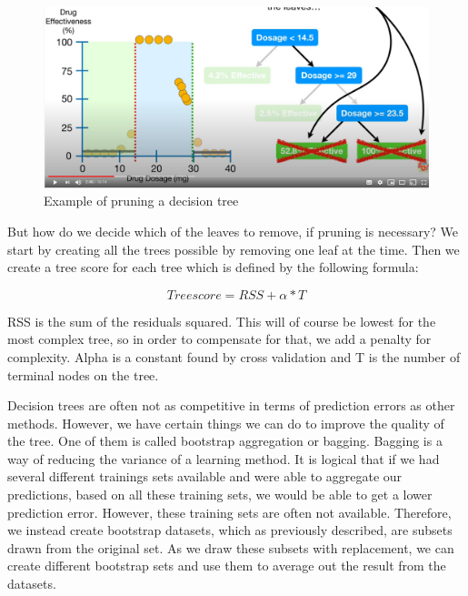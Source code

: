 \begin{figure}[H]
	\centering
	\includegraphics[width=\textwidth]{Img/tree_pruning.PNG}
	\caption{Example of pruning a decision tree}
	\label{fig:tree_pruning}
\end{figure} 

But how do we decide which of the leaves to remove, if pruning is necessary? We start by creating all the trees possible by removing one leaf at the time. Then we create a tree score for each tree which is defined by the following formula:

\begin{equation} \label{eq:3}
Treescore = RSS + \alpha * T 
\end{equation}

RSS is the sum of the residuals squared. This will of course be lowest for the most complex tree, so in order to compensate for that, we add a penalty for complexity. Alpha is a constant found by cross validation and T is the number of terminal nodes on the tree. 

Decision trees are often not as competitive in terms of prediction errors as other methods. However, we have certain things we can do to improve the quality of the tree. One of them is called bootstrap aggregation or bagging. Bagging is a way of reducing the variance of a learning method. It is logical that if we had several different trainings sets available and were able to aggregate our predictions, based on all these training sets, we would be able to get a lower prediction error. However, these training sets are often not available. Therefore, we instead create bootstrap datasets, which as previously described, are subsets drawn from the original set. As we draw these subsets with replacement, we can create different bootstrap sets and use them to average out the result from the datasets.  
 
